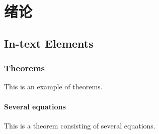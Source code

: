 \documentclass[11pt,twoside]{book} %
\begin{document}

\pagestyle{empty} %

\tableofcontents %

\cleardoublepage %

\pagestyle{fancy} %


\part{绪论}














\chapter{In-text Elements}

\section{Theorems}

This is an example of theorems.

\subsection{Several equations}
This is a theorem consisting of several equations.
\end{document}
